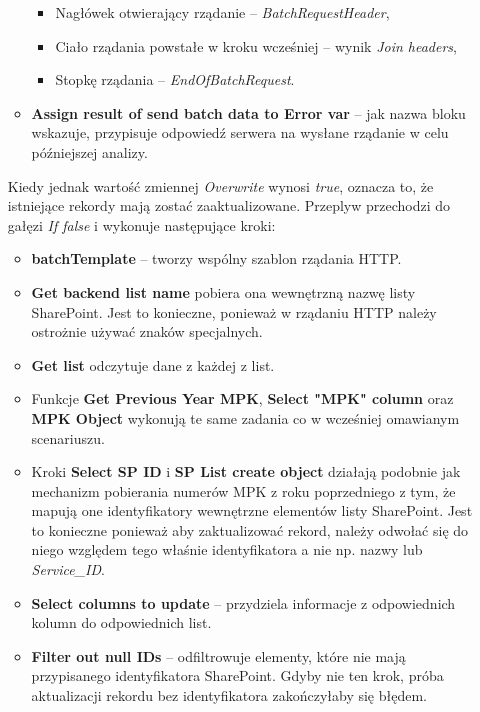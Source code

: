 \begin{enumerate}
\begin{itemize}
\begin{itemize}
        \item Nagłówek otwierający rządanie -- \emph{BatchRequestHeader},
        \item Ciało rządania powstałe w kroku wcześniej -- wynik \emph{Join headers},
        \item Stopkę rządania -- \emph{EndOfBatchRequest}.
    \end{itemize}
    \item \textbf{Assign result of send batch data to Error var} -- jak nazwa bloku wskazuje, przypisuje odpowiedź serwera na wysłane rządanie w celu późniejszej analizy.
    \end{itemize}

    Kiedy jednak wartość zmiennej \emph{Overwrite} wynosi \emph{true}, oznacza to, że istniejące rekordy mają zostać zaaktualizowane. Przeplyw przechodzi do gałęzi \emph{If false} i wykonuje następujące kroki:
    \begin{itemize}
        \item \textbf{batchTemplate} -- tworzy wspólny szablon rządania HTTP.
        \item \textbf{Get backend list name} pobiera ona wewnętrzną nazwę listy SharePoint. Jest to konieczne, ponieważ w rządaniu HTTP należy ostrożnie używać znaków specjalnych.
        \item \textbf{Get list} odczytuje dane z każdej z list.
    \end{itemize}
    \begin{itemize}[label=\textasteriskcentered]
\item Funkcje \textbf{Get Previous Year MPK}, \textbf{Select "MPK" column} oraz \textbf{MPK Object} wykonują te same zadania co w wcześniej omawianym scenariuszu. 
    \end{itemize}
    \begin{itemize}
    \item Kroki \textbf{Select SP ID} i \textbf{SP List create object} działają podobnie jak mechanizm pobierania numerów MPK z roku poprzedniego z tym, że mapują one identyfikatory wewnętrzne elementów listy SharePoint. Jest to konieczne ponieważ aby zaktualizować rekord, należy odwołać się do niego względem tego właśnie identyfikatora a nie np. nazwy lub \emph{Service\_ID}.
    \item \textbf{Select columns to update} -- przydziela informacje z odpowiednich kolumn do odpowiednich list.
    \item \textbf{Filter out null IDs} -- odfiltrowuje elementy, które nie mają przypisanego identyfikatora SharePoint. Gdyby nie ten krok, próba aktualizacji rekordu bez identyfikatora zakończyłaby się błędem.

\end{itemize}
\end{enumerate}
